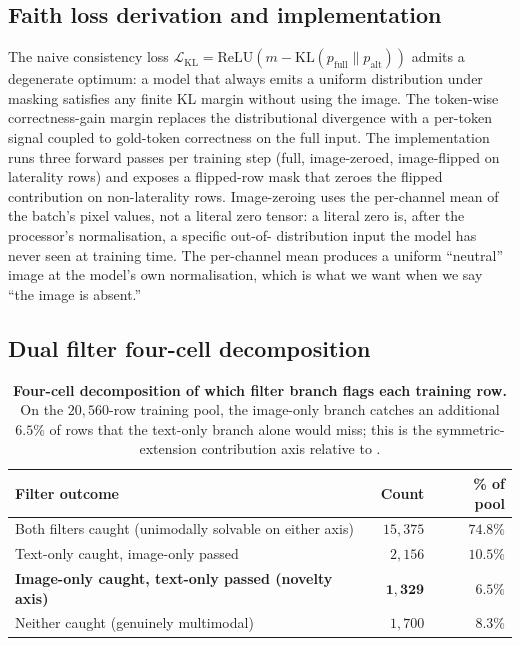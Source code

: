 \documentclass{article}
\begin{document}
\subsection{Faith loss derivation and implementation}
\label{app:faith}

The naive consistency loss
$\mathcal{L}_{\mathrm{KL}} = \mathrm{ReLU}(m - \mathrm{KL}(p_{\mathrm{full}} \| p_{\mathrm{alt}}))$
admits a degenerate optimum: a model that always emits a uniform
distribution under masking satisfies any finite KL margin without using
the image. The token-wise correctness-gain margin replaces the
distributional divergence with a per-token signal coupled to gold-token
correctness on the full input. The implementation runs three forward
passes per training step (full, image-zeroed, image-flipped on
laterality rows) and exposes a flipped-row mask that zeroes the flipped
contribution on non-laterality rows. Image-zeroing uses the per-channel
mean of the batch's pixel values, not a literal zero tensor: a literal
zero is, after the processor's normalisation, a specific out-of-
distribution input the model has never seen at training time. The
per-channel mean produces a uniform ``neutral'' image at the model's own
normalisation, which is what we want when we say ``the image is absent.''

\subsection{Dual filter four-cell decomposition}
\label{app:filter}

\begin{table}[t]
\centering
\small
\caption{\textbf{Four-cell decomposition of which filter branch flags
each training row.} On the $20{,}560$-row training pool, the image-only
branch catches an additional $6.5\%$ of rows that the text-only branch
alone would miss; this is the symmetric-extension contribution axis
relative to \citet{li2025sfc}.}
\label{tab:filter-decomp}
\begin{tabular}{lrr}
\toprule
\textbf{Filter outcome} & \textbf{Count} & \textbf{\% of pool}\\
\midrule
Both filters caught (unimodally solvable on either axis) & $15{,}375$ & $74.8\%$\\
Text-only caught, image-only passed                       & $\phantom{0}2{,}156$  & $10.5\%$\\
\textbf{Image-only caught, text-only passed (novelty axis)} & $\phantom{0}\mathbf{1{,}329}$  & $\mathbf{6.5}\%$\\
Neither caught (genuinely multimodal)                     & $\phantom{0}1{,}700$  & $\phantom{0}8.3\%$\\
\bottomrule
\end{tabular}
\end{table}
\end{document}
